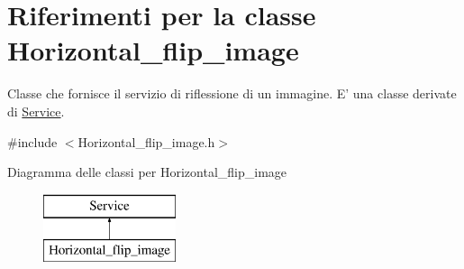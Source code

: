 \hypertarget{class_horizontal__flip__image}{\section{Riferimenti per la classe Horizontal\-\_\-flip\-\_\-image}
\label{class_horizontal__flip__image}
}


Classe che fornisce il servizio di riflessione di un immagine. E' una classe derivate di {\ttfamily \hyperlink{class_service}{Service}}.  




{\ttfamily \#include $<$Horizontal\-\_\-flip\-\_\-image.\-h$>$}

Diagramma delle classi per Horizontal\-\_\-flip\-\_\-image\begin{figure}[H]
\begin{center}
\leavevmode
\includegraphics[height=2.000000cm]{class_horizontal__flip__image}
\end{center}
\end{figure}
